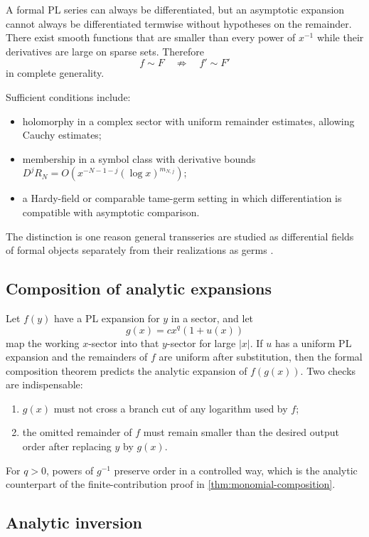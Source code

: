 \documentclass[11pt,oneside]{article}
\numberwithin{equation}{section}
\theoremstyle{definition}
\newcommand{\as}{\sim}
\begin{document}
A formal PL series can always be differentiated, but an asymptotic expansion
cannot always be differentiated termwise without hypotheses on the remainder.
There exist smooth functions that are smaller than every power of \(x^{-1}\)
while their derivatives are large on sparse sets.  Therefore
\[
  f\as F\quad\not\Longrightarrow\quad f'\as F'
\]
in complete generality.

Sufficient conditions include:
\begin{itemize}
\item holomorphy in a complex sector with uniform remainder estimates, allowing
  Cauchy estimates;
\item membership in a symbol class with derivative bounds
  \(D^jR_N=O(x^{-N-1-j}(\log x)^{m_{N,j}})\);
\item a Hardy-field or comparable tame-germ setting in which differentiation is
  compatible with asymptotic comparison.
\end{itemize}
The distinction is one reason general transseries are studied as differential
fields of formal objects separately from their realizations as germs
\cite{VanDerHoeven2006,ADHTransseries}.

\subsection{Composition of analytic expansions}

Let \(f(y)\) have a PL expansion for \(y\) in a sector, and let
\[
  g(x)=cx^q(1+u(x))
\]
map the working \(x\)-sector into that \(y\)-sector for large \(|x|\).  If
\(u\) has a uniform PL expansion and the remainders of \(f\) are uniform after
substitution, then the formal composition theorem predicts the analytic
expansion of \(f(g(x))\).  Two checks are indispensable:
\begin{enumerate}
\item \(g(x)\) must not cross a branch cut of any logarithm used by \(f\);
\item the omitted remainder of \(f\) must remain smaller than the desired output
  order after replacing \(y\) by \(g(x)\).
\end{enumerate}
For \(q>0\), powers of \(g^{-1}\) preserve order in a controlled way, which is
the analytic counterpart of the finite-contribution proof in
\cref{thm:monomial-composition}.

\subsection{Analytic inversion}
\end{document}

